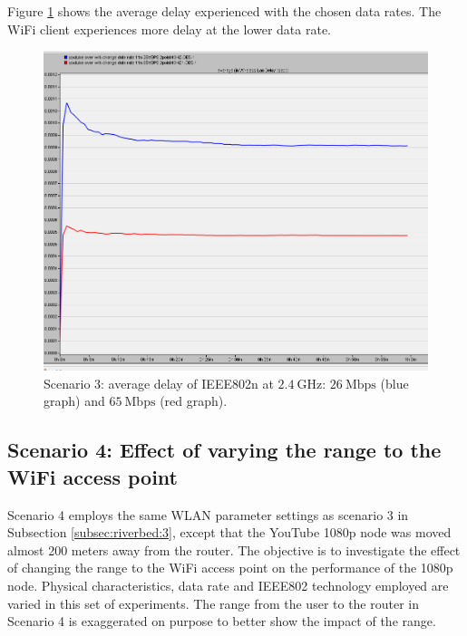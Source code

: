 Figure \ref{fig:3:6} shows the average delay experienced with the chosen data rates. The \gls{WiFi} client experiences more delay at the lower data rate. 

\begin{figure}[H]
	\centering
	\includegraphics[scale=0.3]{Figures/amantianrenamed/Scenari3AveDelayn26M2.4GHzn65Mbps4GHz.png}
	\caption[Scenario 3: average delay according to data rate]{Scenario 3: average delay of \gls{IEEE802}n at $2.4~\mathrm{GHz}$: $26~\mathrm{Mbps}$ (blue graph) and $65~\mathrm{Mbps}$ (red graph). }
	\label{fig:3:6}
\end{figure}

\subsection{Scenario 4: Effect of varying the range to the WiFi access point} \label{subsec:riverbed:4}
Scenario 4 employs the same \gls{WLAN} parameter settings as scenario 3 in Subsection \ref{subsec:riverbed:3}, except that the YouTube 1080p node was moved almost 200 meters away from the router. The objective is to investigate the effect of changing the range to the \gls{WiFi} access point on the performance of the 1080p node. Physical characteristics, data rate and \gls{IEEE802} technology employed are varied in this set of experiments. The range from the user to the router in Scenario 4 is exaggerated on purpose to better show the impact of the range.

